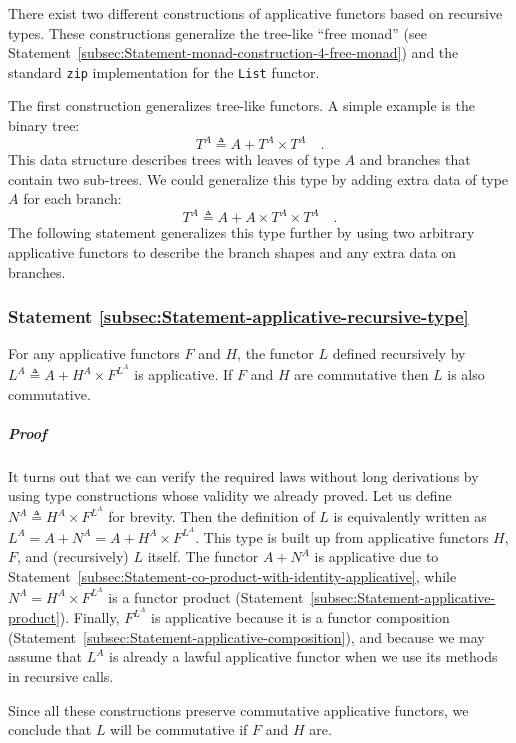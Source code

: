 There exist two different constructions of applicative functors based
on recursive types. These constructions generalize the tree-like \textsf{``}free
monad\textsf{''} (see Statement~\ref{subsec:Statement-monad-construction-4-free-monad})
and the standard \lstinline!zip! implementation for the \lstinline!List!
functor.

The first construction generalizes tree-like functors. A simple example
is the binary tree:
\[
T^{A}\triangleq A+T^{A}\times T^{A}\quad.
\]
This data structure describes trees with leaves of type $A$ and branches
that contain two sub-trees. We could generalize this type by adding
extra data of type $A$ for each branch:
\[
T^{A}\triangleq A+A\times T^{A}\times T^{A}\quad.
\]
The following statement generalizes this type further by using two
arbitrary applicative functors to describe the branch shapes and any
extra data on branches.

\subsubsection{Statement \label{subsec:Statement-applicative-recursive-type}\ref{subsec:Statement-applicative-recursive-type}}

For any applicative functors $F$ and $H$, the functor $L$ defined
recursively by $L^{A}\triangleq A+H^{A}\times F^{L^{A}}$ is applicative.
If $F$ and $H$ are commutative then $L$ is also commutative.

\subparagraph{Proof}

It turns out that we can verify the required laws without long derivations
by using type constructions whose validity we already proved. Let
us define $N^{A}\triangleq H^{A}\times F^{L^{A}}$ for brevity. Then
the definition of $L$ is equivalently written as $L^{A}=A+N^{A}=A+H^{A}\times F^{L^{A}}$.
This type is built up from applicative functors $H$, $F$, and (recursively)
$L$ itself. The functor $A+N^{A}$ is applicative due to Statement~\ref{subsec:Statement-co-product-with-identity-applicative},
while $N^{A}=H^{A}\times F^{L^{A}}$ is a functor product (Statement~\ref{subsec:Statement-applicative-product}).
Finally, $F^{L^{A}}$ is applicative because it is a functor composition
(Statement~\ref{subsec:Statement-applicative-composition}), and
because we may assume that $L^{A}$ is already a lawful applicative
functor when we use its methods in recursive calls.

Since all these constructions preserve commutative applicative functors,
we conclude that $L$ will be commutative if $F$ and $H$ are.

